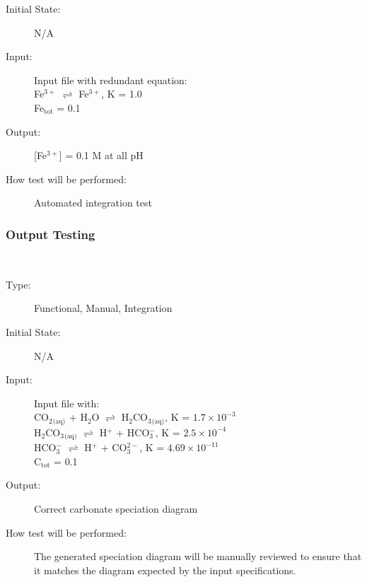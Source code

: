 \documentclass[12pt, titlepage]{article}
\newcounter{testnum} %
\begin{document}
\begin{addmargin}[2em]{0em}
\begin{addmargin}[2em]{0em}
\begin{description}
\item[Initial State:] N/A
					
\item[Input:] Input file with redundant equation:\\
Fe$^{3+}$ $\rightleftharpoons$ Fe$^{3+}$, K = 1.0\\
Fe$_{\text{tot}}$ = 0.1\\
					
\item[Output:] [Fe$^{3+}$] = 0.1 M at all pH
					
\item[How test will be performed:] Automated integration test\\
\end{description}
\end{addmargin}
\end{addmargin}

\subsubsection{Output Testing}

\begin{addmargin}[2em]{0em}
\\
\begin{addmargin}[2em]{0em}
\begin{description}
\item[Type:] Functional, Manual, Integration
					
\item[Initial State:] N/A
					
\item[Input:] Input file with:\\
CO$_2$$_\text{(aq)}$ + H$_2$O $\rightleftharpoons$ H$_2$CO$_3$$_\text{(aq)}$, 
  K = $1.7\times10^{−3}$\\
H$_2$CO$_3$$_\text{(aq)}$ $\rightleftharpoons$ H$^+$ + HCO$_3^-$, 
  K = $2.5\times10^{−4}$\\
HCO$_3^-$ $\rightleftharpoons$ H$^+$ + CO$_3^{2-}$, K = $4.69\times10^{−11}$\\
C$_{\text{tot}}$ = 0.1\\
					
\item[Output:] Correct carbonate speciation diagram\\
					
\item[How test will be performed:] The generated speciation diagram will be 
manually reviewed to ensure that it matches the diagram expected by the input 
specifications.\\
\end{description}
\end{addmargin}
\end{addmargin}
\end{document}
